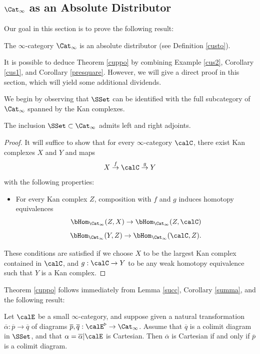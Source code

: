 \subsection{\texorpdfstring{$\Cat_{\infty}$}{Cat\_infinity} as an Absolute Distributor}\label{bisec1.4}

Our goal in this section is to prove the following result:

\begin{theorem}\label{cuppo}
The $\infty$-category $\Cat_{\infty}$ is an absolute distributor (see Definition \ref{custo}).
\end{theorem}

It is possible to deduce Theorem \ref{cuppo} by combining
Example \ref{cus2}, Corollary \ref{cus1}, and Corollary \ref{presquare}. However, we will give a direct proof in this section, which will yield some additional dividends. 

We begin by observing that $\SSet$ can be identified with the full subcategory of $\Cat_{\infty}$ spanned by the Kan complexes.

\begin{lemma}\label{succ}
The inclusion $\SSet \subset \Cat_{\infty}$ admits left and right adjoints.
\end{lemma}

\begin{proof}
It will suffice to show that for every $\infty$-category $\calC$, there exist Kan complexes
$X$ and $Y$ and maps
$$ X \stackrel{f}{\rightarrow} \calC \stackrel{g}{\rightarrow} Y$$
with the following properties:
\begin{itemize}
\item For every Kan complex $Z$, composition with $f$ and $g$ induces homotopy equivalences
$$ \bHom_{ \Cat_{\infty} }( Z, X) \rightarrow \bHom_{ \Cat_{\infty}}( Z, \calC)$$
$$ \bHom_{ \Cat_{\infty} }( Y, Z) \rightarrow \bHom_{ \Cat_{\infty} }(\calC, Z).$$
\end{itemize}
These conditions are satisfied if we choose $X$ to be the largest Kan complex contained in
$\calC$, and $g: \calC \rightarrow Y$ to be any weak homotopy equivalence such that $Y$ is a Kan complex.
\end{proof}

Theorem \ref{cuppo} follows immediately from Lemma \ref{succ}, Corollary \ref{summa}, and the following
result:

\begin{proposition}\label{custa0}
Let $\calE$ be a small $\infty$-category, and suppose given a natural transformation
$\overline{\alpha}: \overline{p} \rightarrow \overline{q}$ of diagrams
$\overline{p}, \overline{q}: \calE^{\triangleright} \rightarrow \Cat_{\infty}$. Assume that
$\overline{q}$ is a colimit diagram in $\SSet$, and that $\alpha = \overline{\alpha} | \calE$ is
Cartesian. Then $\overline{\alpha}$ is Cartesian if and only if $\overline{p}$ is a colimit diagram.
\end{proposition} 

